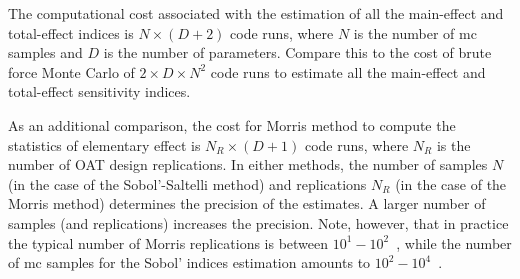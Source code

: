 The computational cost associated with the estimation of all the main-effect and total-effect indices is $N \times (D + 2)$ code runs,
where $N$ is the number of \gls{mc} samples and $D$ is the number of parameters.
Compare this to the cost of brute force Monte Carlo of $2 \times D \times N^2$ code runs to estimate all the main-effect and total-effect sensitivity indices. 

As an additional comparison, the cost for Morris method to compute the statistics of elementary effect is $N_R \times (D + 1)$ code runs,
where $N_R$ is the number of OAT design replications.
In either methods, the number of samples $N$ (in the case of the Sobol'-Saltelli method) and replications $N_R$ (in the case of the Morris method)
determines the precision of the estimates.
A larger number of samples (and replications) increases the precision.
Note, however, that in practice the typical number of Morris replications is between $10^1 - 10^2$~\cite{Saltelli2010}, 
while the number of \gls{mc} samples for the Sobol' indices estimation amounts to $10^2 - 10^4$~\cite{Sobol2001}.
